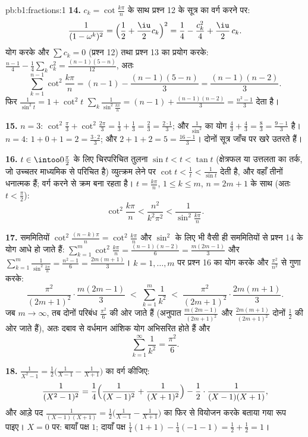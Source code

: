\begin{solution}{pb:b1:fractions:1}
\textbf{14.} $c_k = \cot\frac{k\pi}n$ के साथ प्रश्न 12 के सूत्र का वर्ग करने
पर:
\[
\frac1{(1-\omega^k)^2}
= \Bigl(\frac12 + \frac\iu2 c_k\Bigr)^2
= \frac14 - \frac{c_k^2}4 + \frac\iu2\,c_k .
\]
योग करके और $\sum c_k = 0$ (प्रश्न 12) तथा प्रश्न 13 का प्रयोग करके:
$\frac{n-1}4 - \frac14\sum_k c_k^2 = \frac{(n-1)(5-n)}{12}$, अतः
\[
\sum_{k=1}^{n-1}\cot^2\frac{k\pi}n
= (n-1) - \frac{(n-1)(5-n)}3 = \frac{(n-1)(n-2)}3 .
\]
फिर $\frac1{\sin^2t} = 1 + \cot^2t$ $\sum_k\frac1{\sin^2\frac{k\pi}n} =
(n-1) + \frac{(n-1)(n-2)}3 = \frac{n^2-1}3$ देता है।

\textbf{15.} $n = 3$: $\cot^2\frac\pi3 + \cot^2\frac{2\pi}3 = \frac13 +
\frac13 = \frac23 = \frac{2\cdot1}3$; और $\frac1{\sin^2}$ का योग $\frac43 +
\frac43 = \frac83 = \frac{9-1}3$ है। $n = 4$: $1 + 0 + 1 = 2 =
\frac{3\cdot2}3$; और $2 + 1 + 2 = 5 = \frac{16-1}3$। दोनों सूत्र जाँच पर खरे
उतरते हैं।

\textbf{16.} $t \in \intoo0{\frac\pi2}$ के लिए चिरपरिचित तुलना $\sin t < t <
\tan t$ (क्षेत्रफल या उत्तलता का तर्क, जो उच्चतर माध्यमिक से परिचित है)
व्युत्क्रम लेने पर $\cot t < \frac1t < \frac1{\sin t}$ देती है, और वहाँ
तीनों धनात्मक हैं; वर्ग करने से क्रम बना रहता है। $t = \frac{k\pi}n$, $1
\leq k \leq m$, $n = 2m+1$ के साथ (अतः $t < \frac\pi2$):
\[
\cot^2\frac{k\pi}n < \frac{n^2}{k^2\pi^2} <
\frac1{\sin^2\frac{k\pi}n} .
\]

\textbf{17.} सममितियों $\cot^2\frac{(n-k)\pi}n = \cot^2\frac{k\pi}n$ और
$\sin^2$ के लिए भी वैसी ही सममितियों से प्रश्न 14 के योग आधे हो जाते हैं:
$\sum_{k=1}^{m}\cot^2\frac{k\pi}n = \frac{(n-1)(n-2)}6 = \frac{m(2m-1)}3$ और
$\sum_{k=1}^m\frac1{\sin^2\frac{k\pi}n} = \frac{n^2-1}6 = \frac{2m(m+1)}3$।
$k = 1, \dots, m$ पर प्रश्न 16 का योग करके और $\frac{\pi^2}{n^2}$ से गुणा
करके:
\[
\frac{\pi^2}{(2m+1)^2}\cdot\frac{m(2m-1)}3
\;<\; \sum_{k=1}^{m}\frac1{k^2} \;<\;
\frac{\pi^2}{(2m+1)^2}\cdot\frac{2m(m+1)}3 .
\]
जब $m \to \infty$, तब दोनों परिबंध $\frac{\pi^2}6$ की ओर जाते हैं (अनुपात
$\frac{m(2m-1)}{(2m+1)^2}$ और $\frac{2m(m+1)}{(2m+1)^2}$ दोनों $\frac12$ की
ओर जाते हैं), अतः दबाव से वर्धमान आंशिक योग अभिसरित होते हैं और
\[
\sum_{k=1}^{\infty}\frac1{k^2} = \frac{\pi^2}6 .
\]

\textbf{18.} $\frac1{X^2-1} = \frac12\bigl(\frac1{X-1} - \frac1{X+1}\bigr)$
का वर्ग कीजिए:
\[
\frac1{(X^2-1)^2} = \frac14\Bigl(\frac1{(X-1)^2} +
\frac1{(X+1)^2}\Bigr) - \frac12\cdot\frac1{(X-1)(X+1)} ,
\]
और आड़े पद $\frac1{(X-1)(X+1)} = \frac12\bigl(\frac1{X-1} -
\frac1{X+1}\bigr)$ का फिर से वियोजन करके बताया गया रूप पाइए। $X = 0$ पर:
बायाँ पक्ष $1$; दायाँ पक्ष $\frac14(1 + 1) - \frac14(-1 - 1) = \frac12 +
\frac12 = 1$।


\end{solution}
